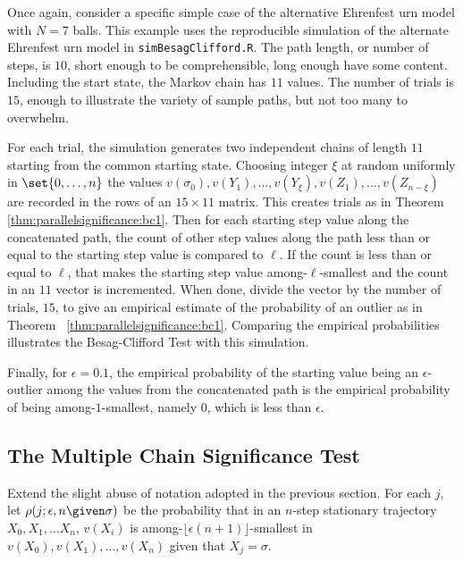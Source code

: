 \documentclass[12pt]{article}
\begin{document}
\begin{example}
    Once again, consider a specific simple case of the alternative
    Ehrenfest urn model with \( N = 7 \) balls.%
    This example uses the reproducible simulation of the alternate
    Ehrenfest urn model in \texttt{simBesagClifford.R}.  The path
    length, or number of steps, is \( 10 \), short enough to be
    comprehensible, long enough have some content.  Including the start
    state, the Markov chain has \( 11 \) values.  The number of trials
    is \( 15 \), enough to illustrate the variety of sample paths, but
    not too many to overwhelm.

    For each trial, the simulation generates two independent chains of
    length \( 11 \) starting from the common starting state.  Choosing
    integer \( \xi \) at random uniformly in \( \set{0, \dots, n} \) the
    values \( v(\sigma_0), v(Y_1), \dots, v(Y_{\xi} ), v(Z_1), \dots, v(Z_
    {n-\xi}) \) are recorded in the rows of an \( 15 \times 11 \)
    matrix.  This creates trials as in Theorem~%
    \ref{thm:parallelsignificance:bc1}.  Then for each starting step
    value along the concatenated path, the count of other step values
    along the path less than or equal to the starting step value is
    compared to \( \ell \).  If the count is less than or equal to \(
    \ell \), that makes the starting step value among-\( \ell \)-smallest
    and the count in an \( 11 \) vector is incremented.  When done,
    divide the vector by the number of trials, \( 15 \), to give an
    empirical estimate of the probability of an outlier as in Theorem~%
    \ref{thm:parallelsignificance:bc1}.  Comparing the empirical
    probabilities illustrates the Besag-Clifford Test with this
    simulation.

    Finally, for \( \epsilon = 0.1 \), the empirical probability of the
    starting value being an \( \epsilon \)-outlier among the values from
    the concatenated path is the empirical probability of being among-\(
    1 \)-smallest, namely \( 0 \), which is less than \( \epsilon \).

\end{example}
\subsection*{The Multiple Chain Significance Test}

Extend the slight abuse of notation adopted in the previous section.
For each \( j \), let \( \rho(j; \epsilon, n \given \sigma) \) be the
probability that in an \( n \)-step stationary trajectory \( X_0, X_1,
\dots X_n \), \( v(X_i) \) is among-\( \lfloor \epsilon(n+1) \rfloor \)-smallest
in \( v(X_0), v(X_1), \dots, v(X_n) \) given that \( X_j = \sigma \).
\end{document}
